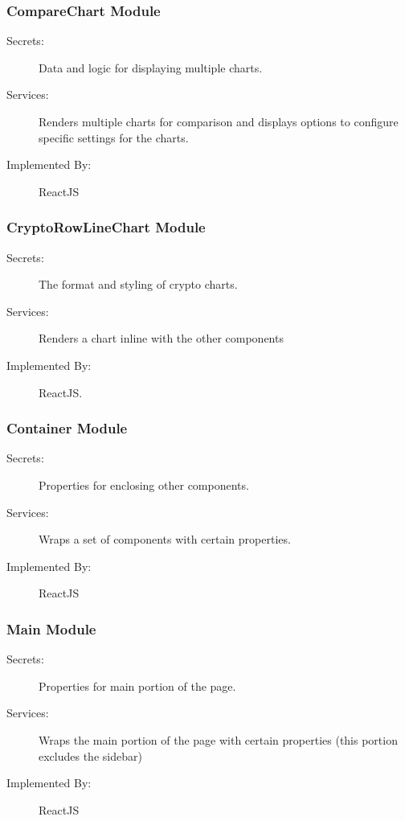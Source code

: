 \documentclass[12pt, titlepage]{article}
\begin{document}
\subsubsection{CompareChart Module \label{mCompareChartModule}}
\begin{description}
\item[Secrets:]Data and logic for displaying multiple charts.
\item[Services:]Renders multiple charts for comparison and displays options to configure specific settings for the charts.
\item[Implemented By:] ReactJS
\end{description}

\subsubsection{CryptoRowLineChart Module \label{mCryptoRowLineChartModule}}
\begin{description}
\item[Secrets:]The format and styling of crypto charts.
\item[Services:]Renders a chart inline with the other components
\item[Implemented By:] ReactJS.
\end{description}

\subsubsection{Container Module \label{mContainerModule}}
\begin{description}
\item[Secrets:]Properties for enclosing other components.
\item[Services:]Wraps a set of components with certain properties.
\item[Implemented By:] ReactJS
\end{description}

\subsubsection{Main Module \label{mMainModule}}
\begin{description}
\item[Secrets:]Properties for main portion of the page.
\item[Services:]Wraps the main portion of the page with certain properties (this portion excludes the sidebar)
\item[Implemented By:] ReactJS
\end{description}
\end{document}
